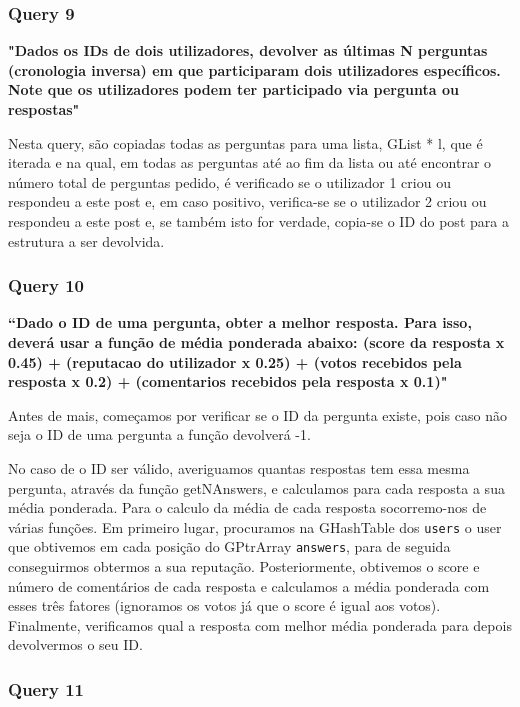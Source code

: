 \documentclass[a4paper]{article}
\begin{document}
\subsubsection*{Query 9}
\label{sec:query9}

\textbf{"Dados os IDs de dois utilizadores, devolver as últimas
N perguntas (cronologia inversa) em que participaram dois utilizadores específicos.
Note que os utilizadores podem ter participado via pergunta ou respostas"}

Nesta query, são copiadas todas as perguntas para uma lista, GList * l, que é iterada
e na qual, em todas as perguntas até ao fim da lista ou até encontrar o número total de
perguntas pedido, é verificado se o utilizador 1 criou ou respondeu a este post e, em
caso positivo, verifica-se se o utilizador 2 criou ou respondeu a este post e, se
também isto for verdade, copia-se o ID do post para a estrutura a ser devolvida.



\subsubsection*{Query 10}
\label{sec:query10}

\textbf{“Dado o ID de uma pergunta, obter a melhor resposta.
Para isso, deverá usar a função de média ponderada abaixo: (score da resposta x 0.45)
+ (reputacao do utilizador x 0.25) + (votos recebidos pela resposta x 0.2) +
(comentarios recebidos pela resposta x 0.1)"}

Antes de mais, começamos por verificar se o ID da pergunta existe, pois caso não
seja o ID de uma pergunta a função devolverá -1. \par
No caso de o ID ser válido, averiguamos quantas respostas tem essa mesma pergunta,
através da função getNAnswers, e calculamos para cada resposta a sua média ponderada.
Para o calculo da média de cada resposta socorremo-nos de várias funções.
Em primeiro lugar, procuramos na GHashTable dos \texttt{users} o user que obtivemos
em cada posição do GPtrArray \texttt{answers}, para de seguida conseguirmos obtermos
a sua reputação.
Posteriormente, obtivemos o score e número de comentários de cada resposta e calculamos
a média ponderada com esses três fatores (ignoramos os votos já que o score é
igual aos votos).
Finalmente, verificamos qual a resposta com melhor média ponderada para depois
devolvermos o seu ID.


\subsubsection*{Query 11}
\label{sec:query11}
\end{document}
